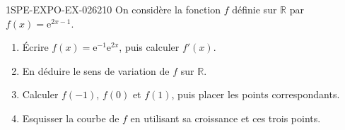 \begin{exercice}{1SPE-EXPO-EX-026}{2}{10}
On considère la fonction $f$ définie sur $\mathbb{R}$ par $f(x) = \mathrm{e}^{2x-1}$.
\begin{enumerate}
  \item Écrire $f(x)=\mathrm{e}^{-1}\mathrm{e}^{2x}$, puis calculer $f'(x)$.
  \item En déduire le sens de variation de $f$ sur $\mathbb{R}$.
  \item Calculer $f(-1)$, $f(0)$ et $f(1)$, puis placer les points correspondants.
  \item Esquisser la courbe de $f$ en utilisant sa croissance et ces trois points.
\end{enumerate}
\end{exercice}
